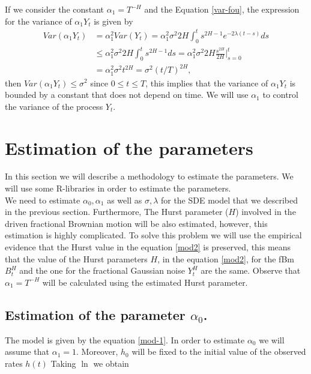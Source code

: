\documentclass[smallextended]{svjour3}
\begin{document}
If we consider the constant $\alpha_1 = T^{-H}$ and the Equation
\eqref{var-fou},
the expression for the variance of $\alpha_1 Y_t$ is given by
\begin{align}
Var(\alpha_1 Y_t)&= \alpha_1^2 Var(Y_t)= \alpha_1^2\sigma^2 2H  \int_0^t
s^{2H-1} e^{-2\lambda (t-s)} ds\nonumber
\\
&\le \alpha_1^2 \sigma^2 2H  \int_0^t s^{2H-1} ds= \alpha_1^2 \sigma^2 2H
\frac{s^{2H}}{2H}\Big|_{s=0}^t \nonumber
\\
&= \alpha_1^2 \sigma^2 t^{2H} = \sigma^2 (t/T)^{2H},\label{var-fou1}
\end{align}
then $Var(\alpha_1 Y_t)\le \sigma^2 $ since $0\le t\le T$, this implies that
the variance of $\alpha_1 Y_t$
is bounded by a constant that does not depend on time. We will use $\alpha_1$
to control the variance of the process $Y_t$.



\section{Estimation of the parameters}
\label{esti}

In this section we will describe a methodology to estimate the parameters.
We will use some R-libraries in order to estimate the parameters. \\

We need to estimate $\alpha_0, \alpha_1$ as well as $\sigma,\lambda$ for the
SDE model that we described in the previous section. Furthermore,
The Hurst parameter ($H$) involved in the driven fractional Brownian motion
will be also estimated, however, this estimation is highly complicated.
To solve this problem we will use the empirical evidence that the Hurst value
in the equation \eqref{mod2}
is preserved, this means that the  value of the  Hurst parameters $H$, in the
equation \eqref{mod2}, for the fBm $B_t^H$ and the one for the
fractional Gaussian noise $Y_t^H$ are the same. Observe that $\alpha_1=T^{-H}$
will be calculated using the estimated Hurst parameter.

\subsection{Estimation of the parameter $\alpha_0$.}


The model is given by the equation \eqref{mod-1}. In order to estimate
$\alpha_0$ we will assume that $\alpha_1=1$. Moreover, $h_0$ will be fixed to
the initial value of the observed rates $h(t)$ Taking $\ln$ we obtain
\end{document}
